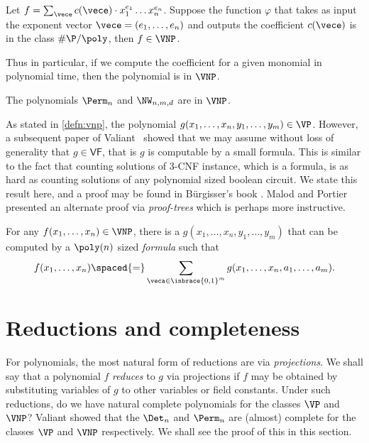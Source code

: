 \begin{theorem} \label{thm:val-criterion}
Let $f = \sum_\vece c(\vece) \cdot x_1^{e_1}\dots x_n^{e_n}$. 
Suppose the function $\varphi$ that takes as input the exponent vector $\vece = (e_1,\dots, e_n)$ and outputs the coefficient $c(\vece)$ is in the class $\#\P/\poly$, then $f \in \VNP$. 
\end{theorem}

Thus in particular, if we compute the coefficient for a given monomial in polynomial time, then the polynomial is in $\VNP$. 

\begin{corollary}
The polynomials $\Perm_n$ and $\NW_{n,m,d}$ are in $\VNP$. 
\end{corollary}

As stated in \autoref{defn:vnp}, the polynomial $g(x_1,\dots, x_n, y_1,\dots, y_m) \in \VP$. 
However, a subsequent paper of Valiant~\cite{v82} showed that we may assume without loss of generality that $g \in \mathsf{VF}$, that is $g$ is computable by a small formula. 
This is similar to the fact that counting solutions of 3-\textsf{CNF} instance, which is a formula, is as hard as counting solutions of any polynomial sized boolean circuit. 
We state this result here, and a proof may be found in B\"urgisser's book \cite{bur00}. Malod and Portier \cite{MP08} presented an alternate proof via \emph{proof-trees} which is perhaps more instructive. 

\begin{theorem}\label{thm:vnp-formula}
For any $f(x_1,\dots, x_n)\in \VNP$, there is a $g(x_1,\dots, x_n, y_1,\dots, y_m)$ that can be computed by a $\poly(n)$ sized \emph{formula} such that 
\[
f(x_1,\dots, x_n)\spaced{=} \sum_{\veca \in \inbrace{0,1}^m} g(x_1,\dots, x_n, a_1,\dots, a_m).
\]
\end{theorem}

\section{Reductions and completeness}

For polynomials, the most natural form of reductions are via \emph{projections}. 
We shall say that a polynomial $f$ \emph{reduces} to $g$ via projections if $f$ may be obtained by substituting variables of $g$ to other variables or field constants. 
Under such reductions, do we have natural complete polynomials for the classes $\VP$ and $\VNP$? 
Valiant \cite{v79} showed that the $\Det_n$ and $\Perm_n$ are (almost) complete for the classes $\VP$ and $\VNP$ respectively. 
We shall see the proof of this in this section. 

